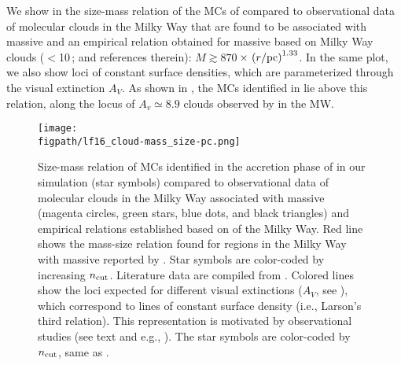 \IfFileExists{emulateapjlegacy.cls}{\documentclass[iop]{emulateapjlegacy}}{\documentclass[iop]{emulateapj}}
\def\figpath{./Fig}
\begin{document}
We show in  the size-mass relation of the MCs of \flower compared to observational data of molecular clouds in the Milky Way that are found to be associated with massive \SF \citep{Beuther02a, Mueller02a, Hill05a, Motte07a} and an empirical relation obtained for massive \SF based on Milky Way clouds ($<$10\,\Msun; \citealt{Kauffmann10b, Kauffmann10c} and references therein): $M \gtrsim 870$\,\Msun$\times\,\left(r/{\rm pc}\right)^{1.33}$.
%
In the same plot, we also show loci of constant surface densities, which are parameterized through the visual extinction $A_V$. As shown in , the MCs identified in \flower lie above this relation, along the locus of $A_v \simeq 8.9$ clouds observed by \citet{Lombardi10a} in the MW.
%

\begin{figure*}[htbp]
\centering
\texttt{[image: \\figpath/lf16\_cloud-mass\_size-pc.png]}
\caption{
Size-mass relation of MCs identified in the accretion phase of \flower in our simulation (star symbols) compared to observational data of molecular clouds in the Milky Way associated with massive \SF (magenta circles, green stars, blue dots, and black triangles) and empirical relations established based on \obs of the Milky Way. Red line shows the 
mass-size relation found for regions in the Milky Way with massive \SF reported by \citet{Kauffmann10b}. Star symbols are color-coded by increasing $n_{\rm cut}$. Literature data are compiled from \citet{Beuther02a, Mueller02a, Hill05a, Motte07a}. 
Colored lines show the loci expected for different visual extinctions ($A_V$, see ), which correspond to lines of
constant surface density (i.e., Larson's third relation). This representation is motivated by observational studies (see text and e.g., \citealt{Lombardi10a}).
The star symbols are color-coded by $n_{\rm cut}$, same as . 
\label{fig:MR}}
\end{figure*}
\end{document}
